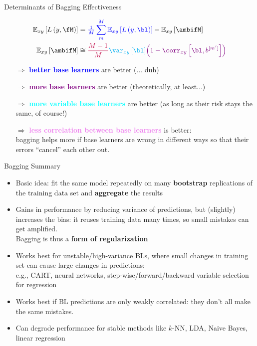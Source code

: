 \documentclass[11pt,compress,t,notes=noshow, xcolor=table]{beamer}
\begin{document}
\begin{vbframe}{Determinants of Bagging Effectiveness}
\begin{small}
\begin{align*}
\Exy\left[L\left(y, \fM\right)\right] &= \textcolor{blue}{\tfrac{1}{M}\sum^M_{m} \Exy\left[L\left(y, \bl \right)\right]} - \Exy\left[\ambifM\right]\\
\Exy\left[\ambifM\right] &\cong 
\textcolor{purple}{\frac{M-1}{M}} \textcolor{cyan}{\var_{xy}\left[\bl\right]} \textcolor{violet}{\left(1 - \corr_{xy}\left[\bl, b^{[m']}\right]\right)}
\end{align*}
\end{small}
\begin{itemize}
\item[$\Rightarrow$] \textcolor{blue}{\textbf{better base learners}} are better {\small (... duh)}
\item[$\Rightarrow$] \textcolor{purple}{\textbf{more base learners}} are better {\small (theoretically, at least...)}\\
\item[$\Rightarrow$] \textcolor{cyan}{\textbf{more variable base learners}} are better {\small(as long as their risk stays the same, of course!)}
\item[$\Rightarrow$] \textcolor{violet}{\textbf{less correlation between base learners}} is better:\\ bagging helps more if base learners are wrong in different ways so that their errors \enquote{cancel} each other out.\\
\end{itemize}


\end{vbframe}

\begin{vbframe}{Bagging Summary}

  \begin{itemize}
    \item Basic idea: fit the same model repeatedly on many \textbf{bootstrap} replications of the training data set and \textbf{aggregate} the results
    \item Gains in performance by reducing variance of predictions, but (slightly) increases the bias: it reuses training data many times, so small mistakes can get amplified.\\ Bagging is thus a \textbf{form of regularization}
    \item Works best for unstable/high-variance BLs, where small changes in training set can cause large changes in predictions:\\
    e.g., CART, neural networks, step-wise/forward/backward variable selection for regression\\
    \item Works best if BL predictions are only weakly correlated: they don't all make the same mistakes.
    \item Can degrade performance for stable methods like $k$-NN, LDA, Naive Bayes, linear regression
  \end{itemize}
\end{vbframe}



\endlecture
\end{document}

